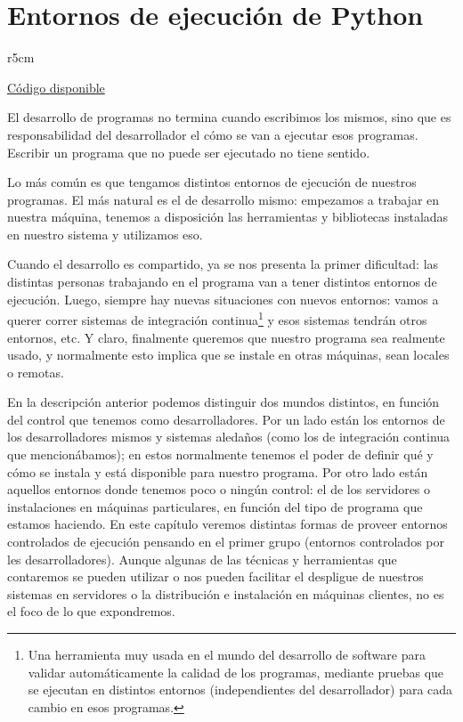 

\chapter{Entornos de ejecución de Python} \label{ch:entornos}

\begin{wraptable}{r}{5cm}
\begin{modulesinfo}
\begin{center}
{\small
    \href{https://github.com/facundobatista/libro-pyciencia/tree/master/código/entornos/}{Código disponible}
}
\end{center}
\end{modulesinfo}
\end{wraptable}

El desarrollo de programas no termina cuando escribimos los mismos, sino que es responsabilidad del desarrollador el cómo se van a ejecutar esos programas. Escribir un programa que no puede ser ejecutado no tiene sentido.

Lo más común es que tengamos distintos entornos de ejecución de nuestros programas. El más natural es el de desarrollo mismo: empezamos a trabajar en nuestra máquina, tenemos a disposición las herramientas y bibliotecas instaladas en nuestro sistema y utilizamos eso.

Cuando el desarrollo es compartido, ya se nos presenta la primer dificultad: las distintas personas trabajando en el programa van a tener distintos entornos de ejecución. Luego, siempre hay nuevas situaciones con nuevos entornos: vamos a querer correr sistemas de integración continua\footnote{Una herramienta muy usada en el mundo del desarrollo de software para validar automáticamente la calidad de los programas, mediante pruebas que se ejecutan en distintos entornos (independientes del desarrollador) para cada cambio en esos programas.} y esos sistemas tendrán otros entornos, etc. Y claro, finalmente queremos que nuestro programa sea realmente usado, y normalmente esto implica que se instale en otras máquinas, sean locales o remotas.

En la descripción anterior podemos distinguir dos mundos distintos, en función del control que tenemos como desarrolladores. Por un lado están los entornos de los desarrolladores mismos y sistemas aledaños (como los de integración continua que mencionábamos); en estos normalmente tenemos el poder de definir qué y cómo se instala y está disponible para nuestro programa. Por otro lado están aquellos entornos donde tenemos poco o ningún control: el de los servidores o instalaciones en máquinas particulares, en función del tipo de programa que estamos haciendo. En este capítulo veremos distintas formas de proveer entornos controlados de ejecución pensando en el primer grupo (entornos controlados por les desarrolladores). Aunque algunas de las técnicas y herramientas que contaremos se pueden utilizar o nos pueden facilitar el despligue de nuestros sistemas en servidores o la distribución e instalación en máquinas clientes, no es el foco de lo que expondremos.


